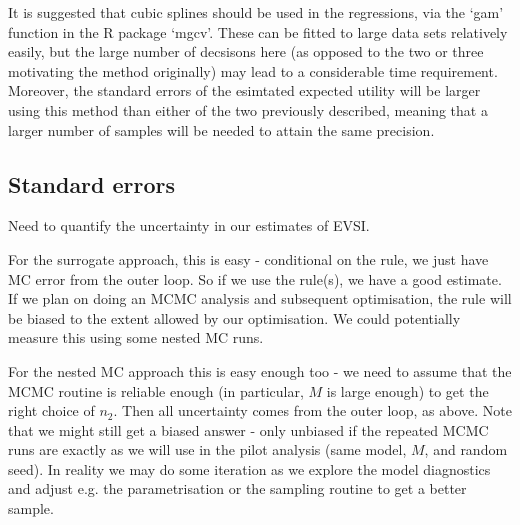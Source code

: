 \documentclass[sagev, Crown]{sagej} %
\begin{document}
It is suggested that cubic splines should be used in the regressions, via the `gam' function in the R package `mgcv'. These can be fitted to large data sets relatively easily, but the large number of decsisons here (as opposed to the two or three motivating the method originally) may lead to a considerable time requirement. Moreover, the standard errors of the esimtated expected utility will be larger using this method than either of the two previously described, meaning that a larger number of samples will be needed to attain the same precision.


\subsection{Standard errors}

Need to quantify the uncertainty in our estimates of EVSI. 

For the surrogate approach, this is easy - conditional on the rule, we just have MC error from the outer loop. So if we use the rule(s), we have a good estimate. If we plan on doing an MCMC analysis and subsequent optimisation, the rule will be biased to the extent allowed by our optimisation. We could potentially measure this using some nested MC runs.

For the nested MC approach this is easy enough too - we need to assume that the MCMC routine is reliable enough (in particular, $M$ is large enough) to get the right choice of $n_2$. Then all uncertainty comes from the outer loop, as above. Note that we might still get a biased answer - only unbiased if the repeated MCMC runs are exactly as we will use in the pilot analysis (same model, $M$, and random seed). In reality we may do some iteration as we explore the model diagnostics and adjust e.g. the parametrisation or the sampling routine to get a better sample.
\end{document}
